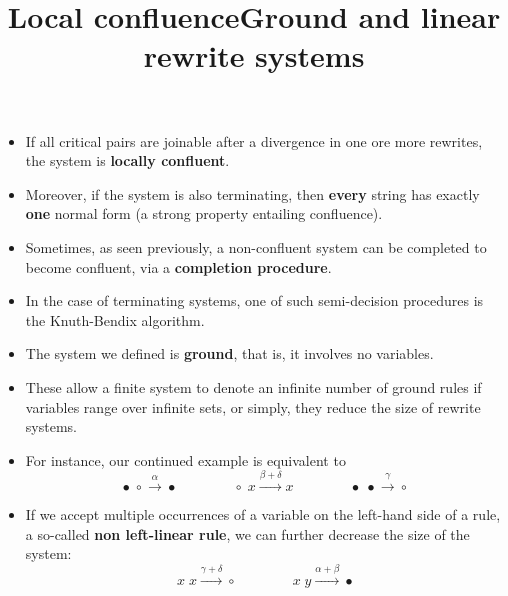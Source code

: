 \documentclass[wide]{slides}
\begin{document}
\begin{slide}
  \title{Local confluence}

  \begin{itemize}

    \item If all critical pairs are joinable after a divergence in one
      ore more rewrites, the system is \textbf{locally confluent}.

    \item Moreover, if the system is also terminating, then
      \textbf{every} string has exactly \textbf{one} normal form (a
      strong property entailing confluence).

    \item Sometimes, as seen previously, a non\hyp{}confluent system
      can be completed to become confluent, via a \textbf{completion
        procedure}.

      \item In the case of terminating systems, one of such
        semi\hyp{}decision procedures is the Knuth\hyp{}Bendix
        algorithm.
  \end{itemize}

\end{slide}

\begin{slide}
  \title{Ground and linear rewrite systems}

  \begin{itemize}

    \item The system we defined is \textbf{ground}, that is, it
      involves no variables.

    \item These allow a finite system to denote an infinite number of
      ground rules if variables range over infinite sets, or simply,
      they reduce the size of rewrite systems.

    \item For instance, our continued example is equivalent to
      \begin{equation*}
        \bullet \; \circ \xrightarrow{\alpha} \bullet
        \qquad\qquad
        \circ \; x \xrightarrow{\beta+\delta} x
        \qquad\qquad
        \bullet \; \bullet \xrightarrow{\gamma} \circ
      \end{equation*}

    \item If we accept multiple occurrences of a variable on the
      left\hyp{}hand side of a rule, a so\hyp{}called \textbf{non
        left\hyp{}linear rule}, we can further decrease the size of
      the system:
      \begin{equation*}
        x  \; x \xrightarrow{\gamma+\delta} \circ\qquad\qquad
        x  \; y \xrightarrow{\alpha+\beta} \bullet
      \end{equation*}

  \end{itemize}
\end{slide}
\end{document}
